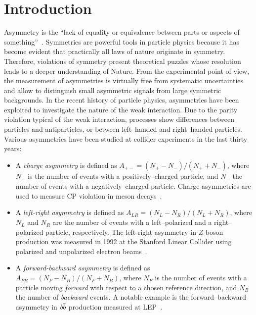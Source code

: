 \chapter{Introduction}
\label{sec:introduction}

Asymmetry is the ``lack of equality or equivalence between parts or
aspects of something''~\cite{oxforddict}.
Symmetries are powerful tools in particle physics because it has
become evident that practically all laws of nature originate in
symmetry. Therefore, violations of symmetry present theoretical
puzzles whose resolution leads to a deeper understanding of Nature. 
From the experimental point of view, the measurement of asymmetries is
virtually free from systematic uncertainties and allow to distinguish
small asymmetric signals from large symmetric backgrounds.
In the recent history of particle physics, asymmetries have been
exploited to investigate the nature of the weak interaction. 
Due to the parity violation typical of the weak
interaction, processes show differences between particles and
antiparticles, or between left--handed and right--handed particles.
Various asymmetries have been studied at collider experiments in the
last thirty years:

\begin{itemize}
\item A {\it charge asymmetry}  is defined as $A_{+-}=(N_+ -
  N_-)/(N_+ +N_-)$, where $N_+$ is the number of events with a
  positively--charged particle, and $N_-$ the number of events with a
  negatively--charged particle. Charge asymmetries are used to measure CP
  violation in meson decays~\cite{LHCb:2012fb}.
\item A {\it left-right asymmetry} is defined as $A_{LR}=(N_L -
  N_R)/(N_L +N_R)$, where $N_L$ and $N_R$ are the number of events with a
  left--polarized and a right--polarized particle, respectively. 
  The left-right asymmetry in $Z$ boson production was
  measured in 1992 at the Stanford Linear Collider using polarized and
  unpolarized electron beams~\cite{Elia:1993ka}.
\item A {\it forward-backward asymmetry} is defined as $A_{FB}=(N_F -
  N_B)/(N_F +N_B)$, where $N_F$ is the number of events with a
  particle moving {\it forward} with respect to a chosen reference
  direction, and $N_B$ the number of {\it backward} events. A notable
  example is the forward--backward asymmetry in $b\bar{b}$ production
  measured at LEP~\cite{ALEPH:2005ab}.
\end{itemize}

